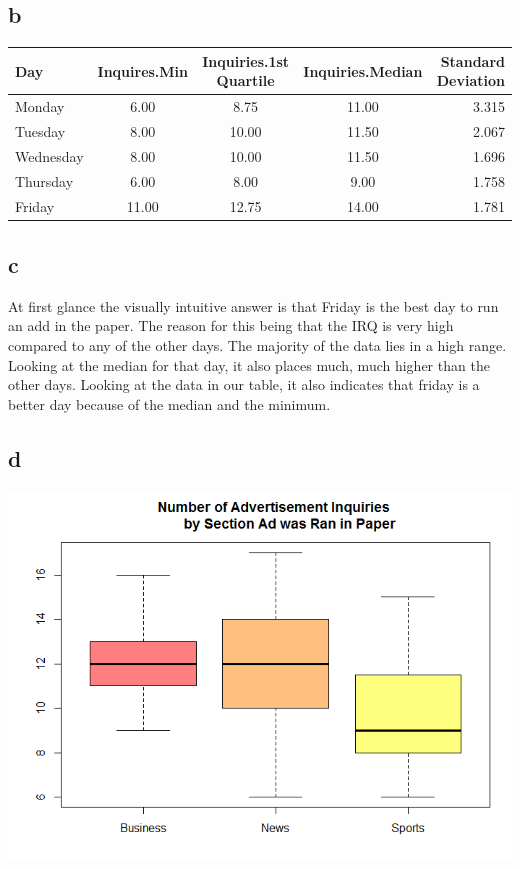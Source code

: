 \documentclass[10pt,letterpaper]{article}
\begin{document}
\subsection*{b}
\begin{tabular}{ l | c | c | c | r }
	Day & Inquires.Min & Inquiries.1st Quartile & Inquiries.Median & Standard Deviation\\ \hline
	Monday & 6.00 & 8.75 & 11.00 & 3.315 \\ \hline
	Tuesday & 8.00 & 10.00 & 11.50 & 2.067 \\ \hline
	Wednesday & 8.00 & 10.00 & 11.50 & 1.696 \\ \hline
	Thursday & 6.00 & 8.00 & 9.00 & 1.758 \\ \hline
	Friday & 11.00 & 12.75 & 14.00 & 1.781 \\ 
\end{tabular}

\subsection*{c}
At first glance the visually intuitive answer is that Friday is the best day to
run an add in the paper. The reason for this being that the IRQ is very high
compared to any of the other days. The majority of the data lies in a high
range. Looking at the median for that day, it also places much, much higher than
the other days. Looking at the data in our table, it also indicates that friday
is a better day because of the median and the minimum.
\subsection*{d}
\includegraphics[scale=.5]{sectionBox}
\end{document}
